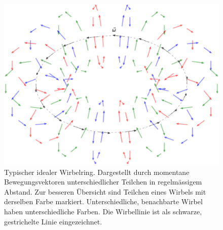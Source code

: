 \begin{figure}
\centering
\includegraphics[width=1\textwidth]{papers/wirbelringe/fig/wirbelring_RGB.pdf}
\caption{Typischer idealer Wirbelring.
Dargestellt durch momentane Bewegungsvektoren unterschiedlicher Teilchen in regelmässigem Abstand.
Zur besseren Übersicht sind Teilchen eines Wirbels mit derselben Farbe markiert.
Unterschiedliche, benachbarte Wirbel haben unterschiedliche Farben.
Die Wirbellinie ist als schwarze, gestrichelte Linie eingezeichnet.\label{Wirbelringe:fig:generell}}
\end{figure}